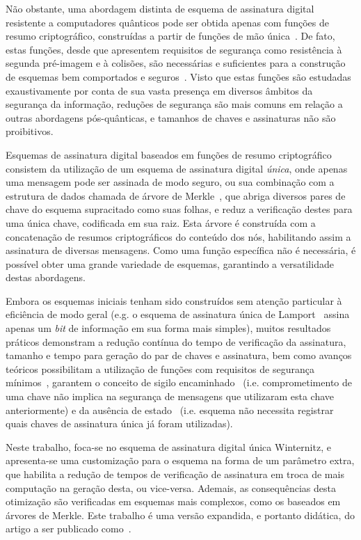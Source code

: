 \documentclass[12pt]{report}
\begin{document}
Não obstante, uma abordagem distinta de esquema de assinatura digital
resistente a computadores quânticos pode ser obtida apenas com funções de
resumo criptográfico, construídas a partir de funções de mão
única~\cite{cryptoeprint:2005:328}. De fato, estas funções, desde que apresentem
requisitos de segurança como resistência à segunda pré-imagem e à colisões, são
necessárias e suficientes para a construção de esquemas bem comportados e
seguros~\cite{Rompel:1990:OFN:100216.100269}. Visto que estas funções são
estudadas exaustivamente por conta de sua vasta presença em diversos âmbitos da
segurança da informação, reduções de segurança são mais comuns em relação a
outras abordagens pós-quânticas, e tamanhos de chaves e assinaturas não são
proibitivos.

Esquemas de assinatura digital baseados em funções de resumo criptográfico
consistem da utilização de um esquema de assinatura digital \emph{única},
onde apenas uma mensagem pode ser assinada de modo seguro,
ou sua combinação com a estrutura de dados chamada de árvore de
Merkle~\cite{Merkle:1989:CDS:118209.118230}, que abriga diversos pares de chave do
esquema supracitado como suas folhas, e reduz a verificação destes para uma
única chave, codificada em sua raiz. Esta árvore é construída com a
concatenação de resumos criptográficos do conteúdo dos nós, habilitando assim a
assinatura de diversas mensagens. Como uma função específica não é necessária,
é possível obter uma grande variedade de esquemas, garantindo a versatilidade
destas abordagens.

Embora os esquemas iniciais tenham sido construídos sem atenção particular à
eficiência de modo geral (e.g. o esquema de assinatura única de Lamport~\cite{Lamport1979}
assina apenas um \emph{bit} de informação em sua forma mais
simples), muitos resultados práticos demonstram a redução contínua do tempo de
verificação da assinatura, tamanho e tempo para geração do par de chaves e
assinatura, bem como avanços teóricos possibilitam a utilização de funções com
requisitos de segurança mínimos~\cite{cryptoeprint:2017:965},
garantem o conceito de sigilo encaminhado~\cite{Buchmann:2011:XPF:2184003.2184011}
(i.e. comprometimento de uma chave não
implica na segurança de mensagens que utilizaram esta chave anteriormente) e da
ausência de estado~\cite{Bernstein2015} (i.e. esquema não necessita registrar
quais chaves de assinatura única já foram utilizadas).

Neste trabalho, foca-se no esquema de assinatura digital única Winternitz, e
apresenta-se uma customização para o esquema na forma de um parâmetro extra,
que habilita a redução de tempos de verificação de assinatura em troca de
mais computação na geração desta, ou vice-versa. Ademais, as consequências
desta otimização são verificadas em esquemas mais complexos, como os baseados
em árvores de Merkle. Este trabalho é uma versão expandida, e portanto didática,
do artigo a ser publicado como~\cite{Peri1806:Tuning}.
\end{document}

